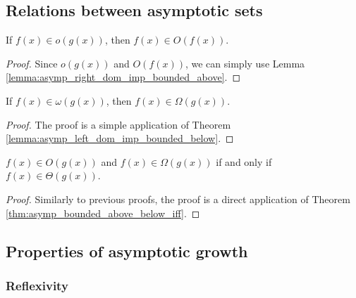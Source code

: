 \subsection{Relations between asymptotic sets}

\begin{lemma}
    \label{lemma:small_o_imp_big_o}
    \leanok
    If $f(x) \in o(g(x))$, then $f(x) \in O(f(x))$.
\end{lemma}

\begin{proof}
    \leanok
    Since $o(g(x))$ and $O(f(x))$, we can simply use Lemma 
    \ref{lemma:asymp_right_dom_imp_bounded_above}.
\end{proof}

\begin{theorem}
    \label{thm:small_omega_imp_big_omega}
    \leanok
    If $f(x) \in \omega(g(x))$, then $f(x) \in \Omega(g(x))$.
\end{theorem}

\begin{proof}
    \leanok
    The proof is a simple application of Theorem 
    \ref{lemma:asymp_left_dom_imp_bounded_below}.
\end{proof}

\begin{theorem}
    \label{thm:big_o_and_omega_iff_theta}
    \leanok
    $f(x) \in O(g(x))$ and $f(x) \in \Omega(g(x))$ if and only if $f(x) \in \Theta(g(x))$.
\end{theorem}

\begin{proof}
    \leanok
    Similarly to previous proofs, the proof is a direct application of Theorem 
    \ref{thm:asymp_bounded_above_below_iff}.
\end{proof}


\subsection{Properties of asymptotic growth}

\subsubsection{Reflexivity}

